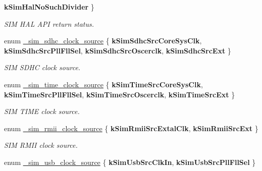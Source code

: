 \begin{DoxyCompactItemize}
{\bfseries k\+Sim\+Hal\+No\+Such\+Divider}
 \}\hypertarget{group__sim__hal_ga3a1d5c9d6e79932e64f798c04fae38fd}{}\label{group__sim__hal_ga3a1d5c9d6e79932e64f798c04fae38fd}
\begin{DoxyCompactList}\small\item\em S\+IM H\+AL A\+PI return status. \end{DoxyCompactList}
\item 
enum \hyperlink{group__sim__hal_gad298a91a63548d70748d40d8a485f3e1}{\+\_\+sim\+\_\+sdhc\+\_\+clock\+\_\+source} \{ {\bfseries k\+Sim\+Sdhc\+Src\+Core\+Sys\+Clk}, 
{\bfseries k\+Sim\+Sdhc\+Src\+Pll\+Fll\+Sel}, 
{\bfseries k\+Sim\+Sdhc\+Src\+Oscerclk}, 
{\bfseries k\+Sim\+Sdhc\+Src\+Ext}
 \}\hypertarget{group__sim__hal_gad298a91a63548d70748d40d8a485f3e1}{}\label{group__sim__hal_gad298a91a63548d70748d40d8a485f3e1}
\begin{DoxyCompactList}\small\item\em S\+IM S\+D\+HC clock source. \end{DoxyCompactList}
\item 
enum \hyperlink{group__sim__hal_ga9ba1c9896979d291bef95527f789bce5}{\+\_\+sim\+\_\+time\+\_\+clock\+\_\+source} \{ {\bfseries k\+Sim\+Time\+Src\+Core\+Sys\+Clk}, 
{\bfseries k\+Sim\+Time\+Src\+Pll\+Fll\+Sel}, 
{\bfseries k\+Sim\+Time\+Src\+Oscerclk}, 
{\bfseries k\+Sim\+Time\+Src\+Ext}
 \}\hypertarget{group__sim__hal_ga9ba1c9896979d291bef95527f789bce5}{}\label{group__sim__hal_ga9ba1c9896979d291bef95527f789bce5}
\begin{DoxyCompactList}\small\item\em S\+IM T\+I\+ME clock source. \end{DoxyCompactList}
\item 
enum \hyperlink{group__sim__hal_ga37be85d1a46e05464021dc63dabbcce9}{\+\_\+sim\+\_\+rmii\+\_\+clock\+\_\+source} \{ {\bfseries k\+Sim\+Rmii\+Src\+Extal\+Clk}, 
{\bfseries k\+Sim\+Rmii\+Src\+Ext}
 \}\hypertarget{group__sim__hal_ga37be85d1a46e05464021dc63dabbcce9}{}\label{group__sim__hal_ga37be85d1a46e05464021dc63dabbcce9}
\begin{DoxyCompactList}\small\item\em S\+IM R\+M\+II clock source. \end{DoxyCompactList}
\item 
enum \hyperlink{group__sim__hal_ga08e8c635a2a5739f0ce629cd15410a7b}{\+\_\+sim\+\_\+usb\+\_\+clock\+\_\+source} \{ {\bfseries k\+Sim\+Usb\+Src\+Clk\+In}, 
{\bfseries k\+Sim\+Usb\+Src\+Pll\+Fll\+Sel}
 \}\hypertarget{group__sim__hal_ga08e8c635a2a5739f0ce629cd15410a7b}{}\label{group__sim__hal_ga08e8c635a2a5739f0ce629cd15410a7b}

\end{DoxyCompactItemize}
